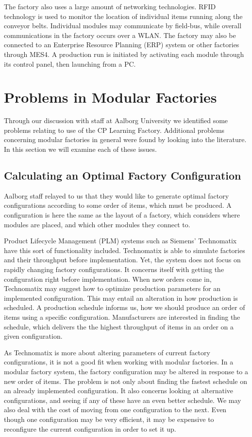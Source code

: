 The factory also uses a large amount of networking technologies. RFID technology is used to monitor the location of individual items running along the conveyor belts. Individual modules may communicate by field-bus, while overall communications in the factory occurs over a WLAN. The factory may also be connected to an Enterprise Resource Planning (ERP) system or other factories through MES4. A production run is initiated by activating each module through its control panel, then launching from a PC.

\section{Problems in Modular Factories}
Through our discussion with staff at Aalborg University we identified some problems relating to use of the CP Learning Factory. Additional problems concerning modular factories in general were found by looking into the literature. In this section we will examine each of these issues. 

\subsection{Calculating an Optimal Factory Configuration}
Aalborg staff relayed to us that they would like to generate optimal factory configurations according to some order of items, which must be produced. A configuration is here the same as the layout of a factory, which considers where modules are placed, and which other modules they connect to.

Product Lifecycle Management (PLM) systems such as Siemens' Technomatix \cite{Siemens2014} have this sort of functionality included. Technomatix is able to simulate factories and their throughput before implementation. Yet, the system does not focus on rapidly changing factory configurations. It concerns itself with getting the configuration right before implementation. When new orders come in, Technomatix may suggest how to optimize production parameters for an implemented configuration. This may entail an alteration in how production is scheduled. A production schedule informs us, how we should produce an order of items using a specific configuration. Manufacturers are interested in finding the schedule, which delivers the the highest throughput of items in an order on a given configuration. 

As Technomatix is more about altering parameters of current factory configurations, it is not a good fit when working with modular factories. In a modular factory system, the factory configuration may be altered in response to a new order of items. The problem is not only about finding the fastest schedule on an already implemented configuration. It also concerns looking at alternative configurations, and seeing if any of these have an even better schedule. We may also deal with the cost of moving from one configuration to the next. Even though one configuration may be very efficient, it may be expensive to reconfigure the current configuration in order to set it up. 

